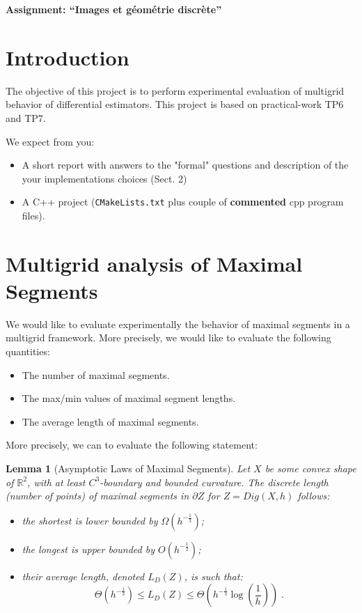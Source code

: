 \documentclass[a4paper, 11pt]{article}
\title{}
\author{}
\date{}
\newtheorem{Lemma}{Lemma}
\begin{document}
\begin{center}
	\LARGE \textbf{Assignment: ``Images et g\'eom\'etrie discr\`ete''}
\end{center}

\section*{Introduction}

The objective of this project is to perform experimental evaluation of
multigrid behavior of differential estimators. This project is based
on practical-work TP6 and TP7.

We expect from you:
\begin{itemize}
\item A short report with answers to the "formal" questions and
  description of the your implementations choices (Sect. 2)
\item A C++ project (\texttt{CMakeLists.txt} plus couple of
  \textbf{commented} cpp program files).
\end{itemize}




\section{Multigrid analysis of Maximal Segments}

We would like to evaluate experimentally the behavior of maximal
segments in a multigrid framework. More precisely, we would like to
evaluate the following quantities:
\begin{itemize}
\item The number of maximal segments.
\item The max/min values of maximal segment lengths.
\item The average length of maximal segments.
\end{itemize}

More precisely, we can to evaluate the following statement:

\begin{Lemma}[Asymptotic Laws of Maximal Segments]
  \label{lem-asymptotic-digital-length-ms}
   Let $X$ be some convex shape of $\mathbb{R}^2$, with at least
   $C^3$-boundary and bounded curvature.  The discrete length (number
   of points) of
   maximal segments in $\partial Z$ for $Z=Dig(X,h)$ follows:
   \begin{itemize}
   \item the shortest is lower bounded by
     $\Omega(h^{-\frac{1}{3}})$;
   \item the longest is  upper bounded by
     $O(h^{-\frac{1}{2}})$;
   \item their average length, denoted $L_D({Z})$, is
     such that:
  \begin{equation}
    \label{eq:lengthMS}
    \Theta(h^{-\frac{1}{3}}) \le L_D( {Z} ) \le \Theta(h^{-\frac{1}{3}} \log \left(\frac{1}{h}\right))\;.
  \end{equation}
   \end{itemize}
\end{Lemma}
\end{document}
